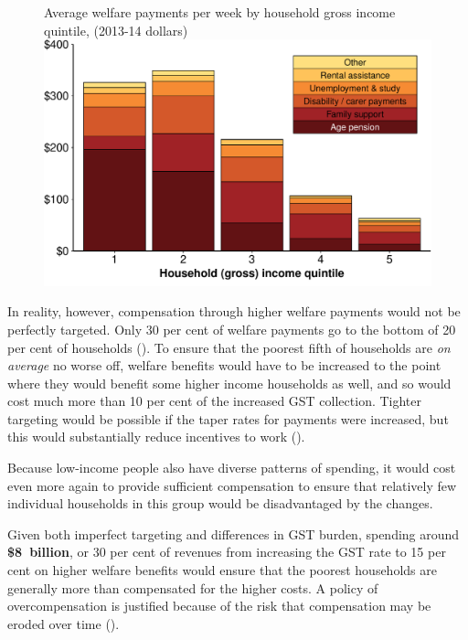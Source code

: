 \begin{figure}[tb]
%
{Average welfare payments per week by household gross income quintile, (2013-14 dollars)}
\includegraphics[width=\columnwidth]{atlas/figure/GST-Figure-6-1.pdf}

\end{figure}

In reality, however, compensation through higher welfare payments would not be perfectly targeted. Only 30 per cent of welfare payments go to the bottom of 20 per cent of households (). To ensure that the poorest fifth of households are \emph{on average} no worse off, welfare benefits would have to be increased to the point where they would benefit some higher income households as well, and so would cost much more than 10 per cent of the increased GST collection. Tighter targeting would be possible if the taper rates for payments were increased, but this would substantially reduce incentives to work (). 

Because low-income people also have diverse patterns of spending, it would cost even more again to provide sufficient compensation to ensure that relatively few individual households in this group would be disadvantaged by the changes. 

Given both imperfect targeting and differences in GST burden, spending around \textbf{\$8~billion}, or 30 per cent of revenues from increasing the GST rate to 15 per cent  on higher welfare benefits would ensure that the poorest households are generally more than compensated for the higher costs. A policy of overcompensation is justified because of the risk that compensation may be eroded over time ().

